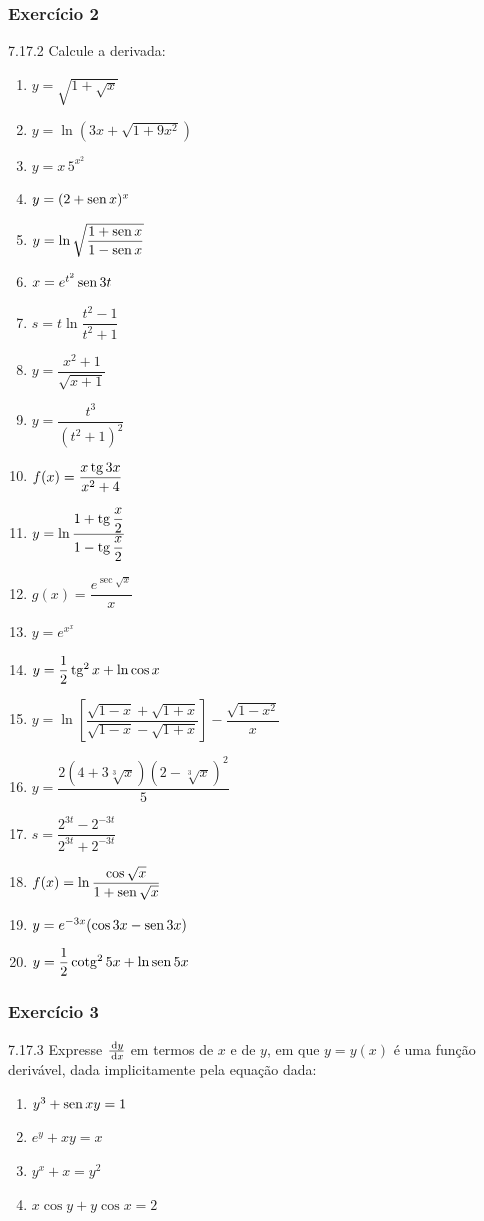 \subsubsection*{Exercício 2}
\begin{exercicio}[2]{7.17.2}
Calcule a derivada:
\begin{enumerate}[label=\alph*)]
    \item $y = \sqrt{1 + \sqrt{x}}$
    \item $y = \ln(3x + \sqrt{1 + 9x^2})$
    \item $y = x\,5^{x^2}$
    \item $y = (2 + \operatorname{sen} x)^x$
    \item $y = \ln\sqrt{\dfrac{1 + \operatorname{sen} x}{1 - \operatorname{sen} x}}$
    \item $x = e^{t^2}\operatorname{sen} 3t$
    \item $s = t\ln\dfrac{t^2 - 1}{t^2 + 1}$
    \item $y = \dfrac{x^2 + 1}{\sqrt{x + 1}}$
    \item $y = \dfrac{t^3}{(t^2 + 1)^2}$
    \item $f(x) = \dfrac{x\operatorname{tg} 3x}{x^2 + 4}$
    \item $y = \ln\dfrac{1 + \operatorname{tg}\dfrac{x}{2}}{1 - \operatorname{tg}\dfrac{x}{2}}$
    \item $g(x) = \dfrac{e^{\sec\sqrt{x}}}{x}$
    \item $y = e^{x^x}$
    \item $y = \dfrac{1}{2}\operatorname{tg}^2 x + \ln\cos x$
    \item $y = \ln\!\left[\dfrac{\sqrt{1 - x} + \sqrt{1 + x}}{\sqrt{1 - x} - \sqrt{1 + x}}\right] - \dfrac{\sqrt{1 - x^2}}{x}$
    \item $y = \dfrac{2(4 + 3\sqrt[3]{x})(2 - \sqrt[3]{x})^2}{5}$
    \item $s = \dfrac{2^{3t} - 2^{-3t}}{2^{3t} + 2^{-3t}}$
    \item $f(x) = \ln\dfrac{\cos\sqrt{x}}{1 + \operatorname{sen}\sqrt{x}}$
    \item $y = e^{-3x}(\cos 3x - \operatorname{sen} 3x)$
    \item $y = \dfrac{1}{2}\operatorname{cotg}^2 5x + \ln\operatorname{sen} 5x$
\end{enumerate}
\end{exercicio}

\subsubsection*{Exercício 3}
\begin{exercicio}[3]{7.17.3}
Expresse $\frac{\,\mathrm{d} y}{\,\mathrm{d} x}$ em termos de $x$ e de $y$, em que $y = y(x)$ é uma função derivável, dada implicitamente pela equação dada:
\begin{enumerate}[label=\alph*)]
    \item $y^3 + \operatorname{sen} xy = 1$
    \item $e^y + xy = x$
    \item $y^x + x = y^2$
    \item $x\cos y + y\cos x = 2$
\end{enumerate}
\end{exercicio}

